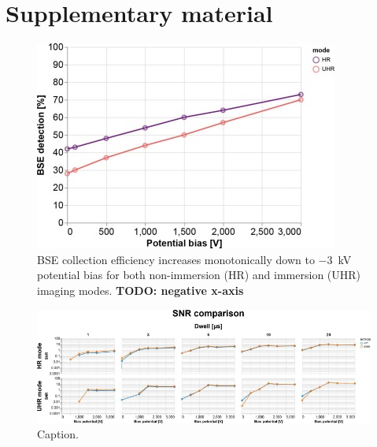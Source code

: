 \clearpage
\section{Supplementary material}
\label{sec:2_supplement}
\renewcommand{\thefigure}{S\arabic{figure}}
\setcounter{figure}{0}    

\begin{figure}[!tbh]
    \centering
    \includegraphics[width=0.6\linewidth]{chapter-2/figures_JPEG_LQ/fig2-S1_percentages.jpg}
    \caption{BSE collection efficiency increases monotonically down to \SI{-3}{\kilo\volt} potential bias for both non-immersion (HR) and immersion (UHR) imaging modes.
    \textbf{TODO: negative x-axis}}
    \label{fig:2.S1_percentages}
\end{figure}



\begin{figure}[!tbh]
    \centering
    \includegraphics[width=\linewidth]{chapter-2/figures_JPEG_LQ/fig2-S2_comparison.jpg}
    \caption{Caption.}
    \label{fig:2.S2_comparison}
\end{figure}

